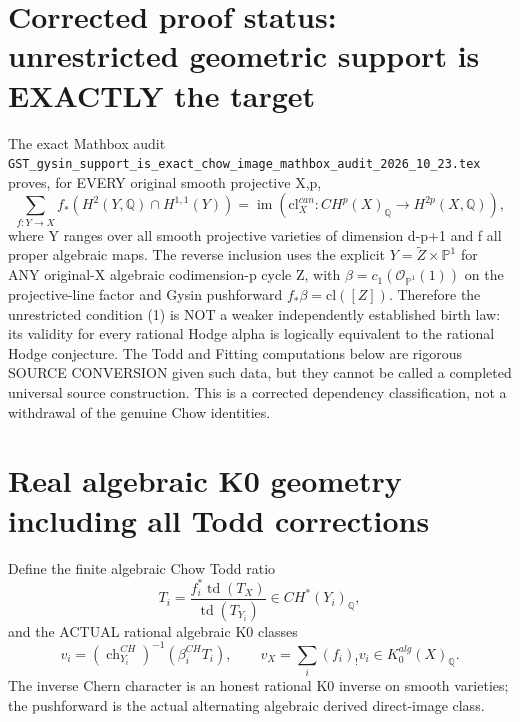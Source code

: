 \documentclass[11pt]{article}
\begin{document}
\section{Corrected proof status: unrestricted geometric support is EXACTLY the target}
The exact Mathbox audit
\texttt{GST\_gysin\_support\_is\_exact\_chow\_image\_mathbox\_audit\_2026\_10\_23.tex}
proves, for EVERY original smooth projective X,p,
\[
 \sum_{f:Y\to X}
   f_*(H^2(Y,\mathbb Q)\cap H^{1,1}(Y))
   =\operatorname{im}
     (\mathrm{cl}_X^{can}:CH^p(X)_\mathbb Q
                            \to H^{2p}(X,\mathbb Q)),
\]
where Y ranges over all smooth projective varieties
of dimension d-p+1 and f all proper algebraic maps.
The reverse inclusion uses the explicit
$Y=\widetilde Z\times\mathbb P^1$
for ANY original-X algebraic codimension-p cycle Z,
with $\beta=c_1(\mathcal O_{\mathbb P^1}(1))$ on
the projective-line factor and Gysin pushforward
$f_*\beta=\mathrm{cl}([Z])$.
Therefore the unrestricted condition (1) is
NOT a weaker independently established birth law:
its validity for every rational Hodge alpha
is logically equivalent to the rational Hodge conjecture.
The Todd and Fitting computations below are rigorous
SOURCE CONVERSION given such data, but they cannot
be called a completed universal source construction.
This is a corrected dependency classification,
not a withdrawal of the genuine Chow identities.

\section{Real algebraic K0 geometry including all Todd corrections}
Define the finite algebraic Chow Todd ratio
\[
 T_i=\frac{f_i^*\operatorname{td}(T_X)}
                  {\operatorname{td}(T_{Y_i})}
 \in CH^*(Y_i)_{\mathbb Q},                         \tag{3}
\]
and the ACTUAL rational algebraic K0 classes
\[
 v_i=(\operatorname{ch}_{Y_i}^{CH})^{-1}
                  (\beta_i^{CH} T_i),\qquad
 v_X=\sum_i(f_i)_!v_i\in K_0^{alg}(X)_{\mathbb Q}.   \tag{4}
\]
The inverse Chern character is an honest rational K0 inverse on smooth varieties; the pushforward is the actual alternating algebraic derived direct-image class.
\end{document}
